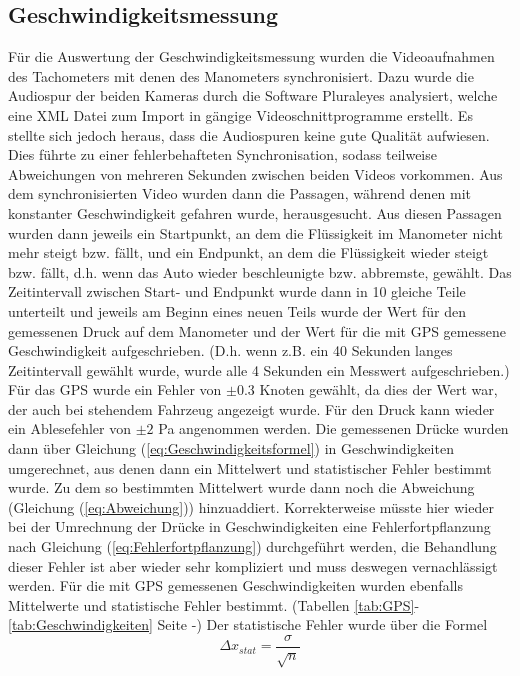 \subsection{Geschwindigkeitsmessung}
Für die Auswertung der Geschwindigkeitsmessung wurden die Videoaufnahmen des Tachometers mit denen des Manometers synchronisiert. Dazu wurde die Audiospur der beiden Kameras durch die Software Pluraleyes analysiert, welche eine XML Datei zum Import in gängige Videoschnittprogramme erstellt. Es stellte sich jedoch heraus, dass die Audiospuren keine gute Qualität aufwiesen. Dies führte zu einer fehlerbehafteten Synchronisation, sodass teilweise Abweichungen von mehreren Sekunden zwischen beiden Videos vorkommen.
Aus dem synchronisierten Video wurden dann die Passagen, während denen mit konstanter Geschwindigkeit gefahren wurde, herausgesucht. Aus diesen Passagen wurden dann jeweils ein Startpunkt, an dem die Flüssigkeit im Manometer nicht mehr steigt bzw. fällt, und ein Endpunkt, an dem die Flüssigkeit wieder steigt bzw. fällt, d.h. wenn das Auto wieder beschleunigte bzw. abbremste, gewählt. Das Zeitintervall zwischen Start- und Endpunkt wurde dann in 10 gleiche Teile unterteilt und jeweils am Beginn eines neuen Teils wurde der Wert für den gemessenen Druck auf dem Manometer und der Wert für die mit GPS gemessene Geschwindigkeit aufgeschrieben. (D.h. wenn z.B. ein 40 Sekunden langes Zeitintervall gewählt wurde, wurde alle 4 Sekunden ein Messwert aufgeschrieben.)
\\
Für das GPS wurde ein Fehler von $\pm 0.3$ Knoten gewählt, da dies der Wert war, der auch bei stehendem Fahrzeug angezeigt wurde. Für den Druck kann wieder ein Ablesefehler von $\pm 2$ Pa angenommen werden. Die gemessenen Drücke wurden dann über Gleichung (\ref{eq:Geschwindigkeitsformel}) in Geschwindigkeiten umgerechnet, aus denen dann ein Mittelwert und statistischer Fehler bestimmt wurde. Zu dem so bestimmten Mittelwert wurde dann noch die Abweichung (Gleichung (\ref{eq:Abweichung})) hinzuaddiert. Korrekterweise müsste hier wieder bei der Umrechnung der Drücke in Geschwindigkeiten eine Fehlerfortpflanzung nach Gleichung (\ref{eq:Fehlerfortpflanzung}) durchgeführt werden, die Behandlung dieser Fehler ist aber wieder sehr kompliziert und muss deswegen vernachlässigt werden. Für die mit GPS gemessenen Geschwindigkeiten wurden ebenfalls Mittelwerte und statistische Fehler bestimmt. (Tabellen \ref{tab:GPS}-\ref{tab:Geschwindigkeiten} Seite \pageref{tab:GPS}-\pageref{tab:Geschwindigkeiten}) Der statistische Fehler wurde über die Formel
\begin{equation}
\Delta x_{stat} = \frac{\sigma}{\sqrt{n}}
\end{equation}
